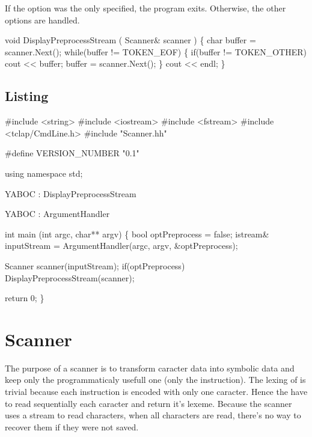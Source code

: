 \newpar If the option was the only specified, the program exits. Otherwise, the other options are handled.

\nwenddocs{}\endmoddef\nwstartdeflinemarkup\nwenddeflinemarkup
void DisplayPreprocessStream ( Scanner& scanner ) \{
        char buffer = scanner.Next();
        while(buffer != TOKEN_EOF) \{
                if(buffer != TOKEN_OTHER) cout << buffer;
                buffer = scanner.Next();
        \}
        cout << endl;
\}
\nwendcode{}\nwdocspar

\subsection{Listing}
\nwenddocs{}\endmoddef\nwstartdeflinemarkup\nwenddeflinemarkup
#include <string>
#include <iostream>
#include <fstream>
#include <tclap/CmdLine.h>
#include "Scanner.hh"

#define VERSION_NUMBER "0.1" 

using namespace std;

\LA{}YABOC : DisplayPreprocessStream\RA{}

\LA{}YABOC : ArgumentHandler\RA{}

int main (int argc, char** argv) \{
        bool optPreprocess = false;
        istream& inputStream = ArgumentHandler(argc, argv, &optPreprocess);     

        Scanner scanner(inputStream);
        if(optPreprocess) DisplayPreprocessStream(scanner);

        return 0;
\}
\nwendcode{}\nwdocspar

\nwenddocs{}\endmoddef\nwstartdeflinemarkup\nwenddeflinemarkup
\nwendcode{}\nwdocspar
\nwenddocs{}\section{Scanner}
The purpose of a scanner is to transform caracter data into symbolic data and keep only the programmaticaly usefull one (\ie only the instruction). The lexing of \brainfuck is trivial because each instruction is encoded with only one caracter. Hence the  have to read sequentially each caracter and return it's \gls{lexeme}. Because the scanner uses a stream to read characters, when all characters are read, there's no way to recover them if they were not saved.

